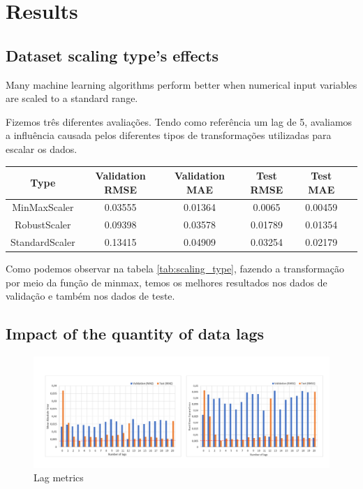 \section{Results}
\label{sec:Results}

\subsection{Dataset scaling type's effects}
Many machine learning algorithms perform better when numerical input variables are scaled to a standard range.

Fizemos três diferentes avaliações. Tendo como referência um lag de 5, avaliamos a influência causada pelos diferentes tipos de transformações utilizadas para escalar os dados.


\begin{center}
\begin{tabular}{ |c|c|c|c|c|c| } 
\hline
Type & Validation RMSE & Validation MAE & Test RMSE & Test MAE \\
\hline
MinMaxScaler & 0.03555 & 0.01364 & 0.0065 & 0.00459 \\ 
RobustScaler & 0.09398 & 0.03578 & 0.01789 & 0.01354 \\
StandardScaler & 0.13415 & 0.04909 & 0.03254 & 0.02179 \\
\hline
\end{tabular}
\label{tab:scaling_type}
\end{center}

Como podemos observar na tabela \ref{tab:scaling_type}, fazendo a transformação por meio da função de minmax, temos os melhores resultados nos dados de validação e também nos dados de teste.

\subsection{Impact of the quantity of data lags}

\begin{figure}[h!]
    \centering
    \includegraphics[width=1.0\textwidth]{images/Lag_metrics.png}
    \caption{Lag metrics}
    \label{fig:lag_metrics}
\end{figure}


